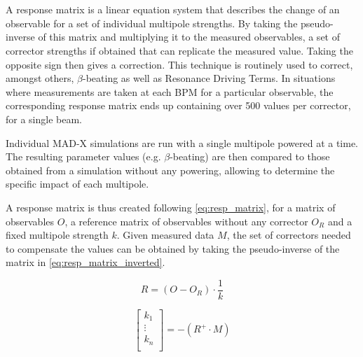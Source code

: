 \section{}


\subsection{}

A response matrix is a linear equation system that describes the change of an observable for a set
of individual multipole strengths. By taking the pseudo-inverse of this matrix and multiplying it to
the measured observables, a set of corrector strengths if obtained that can replicate the measured
value. Taking the opposite sign then gives a correction.  This technique is routinely used to
correct, amongst others, $\beta$-beating as well as Resonance Driving Terms. In situations where
measurements are taken at each BPM for a particular observable, the corresponding response matrix
ends up containing over 500 values per corrector, for a single beam.

Individual MAD-X simulations are run with a single multipole powered at a time. The resulting
parameter values (e.g. $\beta$-beating) are then compared to those obtained from a simulation without
any powering, allowing to determine the specific impact of each multipole.

A response matrix is thus created following \cref{eq:resp_matrix}, for a matrix of observables
$O$, a reference matrix of observables without any corrector $O_R$ and a fixed multipole strength
$k$. Given measured data $M$, the set of correctors needed to compensate the values can be obtained
by taking the pseudo-inverse of the matrix in \cref{eq:resp_matrix_inverted}.

\begin{equation}
  R = \left(O - O_R \right) \cdot \frac{1}{k}
  \label{eq:resp_matrix}
\end{equation}

\begin{equation}
  \begin{bmatrix}
    k_1 \\
    \vdots \\
    k_n \\
  \end{bmatrix}
  = -(R^{+} \cdot M)
  \label{eq:resp_matrix_inverted}
\end{equation}
 

